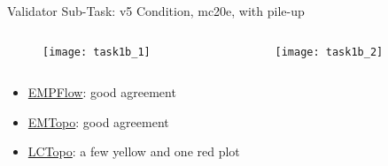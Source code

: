 \begin{frame}{Validator Sub-Task: v5 Condition, mc20e, with pile-up}
    \begin{columns}
        \begin{column}{0.5\textwidth}
            \begin{figure}
                \centering
                \texttt{[image: task1b\_1]}
            \end{figure}
        \end{column}
        \begin{column}{0.5\textwidth}
            \begin{figure}
                \centering
                \texttt{[image: task1b\_2]}
            \end{figure}
        \end{column}
    \end{columns}
        \begin{itemize}
        \item \href{https://atlas-computing.web.cern.ch/atlas-computing/links/PhysValDir/JetEtMiss/jet_21-07-08_task1b/AntiKt4EMPFlowJets/index.html}{EMPFlow}: good agreement
        \item \href{https://atlas-computing.web.cern.ch/atlas-computing/links/PhysValDir/JetEtMiss/jet_21-07-08_task1b/AntiKt4EMTopoJets/index.html}{EMTopo}: good agreement 
        \item \href{https://atlas-computing.web.cern.ch/atlas-computing/links/PhysValDir/JetEtMiss/jet_21-07-08_task1b/AntiKt4LCTopoJets/index.html}{LCTopo}: a few yellow and one red plot 
    \end{itemize}
\end{frame}